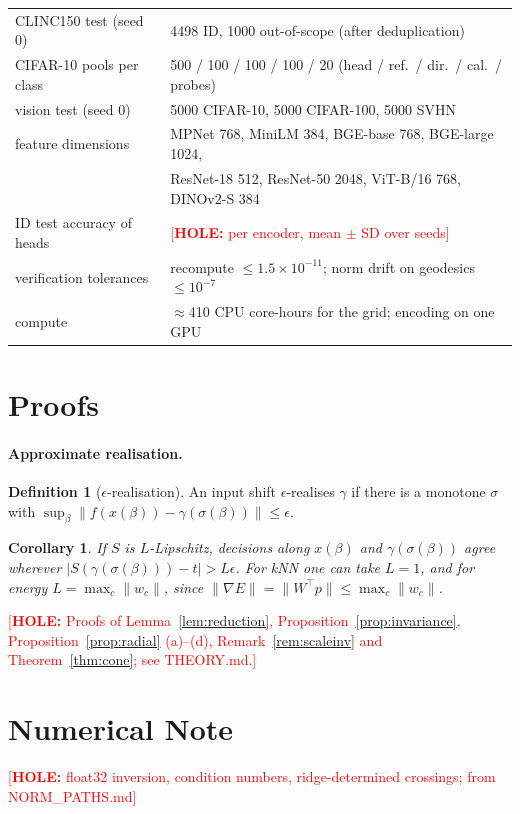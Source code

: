 \documentclass[twoside]{article}
\newtheorem{corollary}{Corollary}
\theoremstyle{definition}
\newtheorem{definition}{Definition}
\theoremstyle{remark}
\newcommand{\hole}[1]{\textcolor{red}{[\textbf{HOLE:} #1]}}
\begin{document}
\begin{table}[!htbp]
\begin{tabular}{ll}
CLINC150 test (seed 0) & 4498 ID, 1000 out-of-scope (after deduplication) \\
CIFAR-10 pools per class & 500 / 100 / 100 / 100 / 20 (head / ref.\ / dir.\ / cal.\ / probes) \\
vision test (seed 0) & 5000 CIFAR-10, 5000 CIFAR-100, 5000 SVHN \\
feature dimensions & MPNet 768, MiniLM 384, BGE-base 768, BGE-large 1024, \\
 & ResNet-18 512, ResNet-50 2048, ViT-B/16 768, DINOv2-S 384 \\
ID test accuracy of heads & \hole{per encoder, mean $\pm$ SD over seeds} \\
verification tolerances & recompute $\le1.5\times10^{-11}$; norm drift on geodesics $\le10^{-7}$ \\
compute & $\approx$410 CPU core-hours for the grid; encoding on one GPU \\
\bottomrule
\end{tabular}
\end{table}

\section{Proofs}\label{app:proofs}
\paragraph{Approximate realisation.}
\begin{definition}[$\epsilon$-realisation]\label{def:realise}
An input shift $\epsilon$-realises $\gamma$ if there is a monotone $\sigma$ with
$\sup_\beta\|f(x(\beta))-\gamma(\sigma(\beta))\|\le\epsilon$.
\end{definition}
\begin{corollary}
If $S$ is $L$-Lipschitz, decisions along $x(\beta)$ and $\gamma(\sigma(\beta))$ agree wherever
$|S(\gamma(\sigma(\beta)))-t|>L\epsilon$. For kNN one can take $L=1$, and for energy $L=\max_c\|w_c\|$, since
$\|\nabla E\|=\|W^\top p\|\le\max_c\|w_c\|$.
\end{corollary}

\hole{Proofs of Lemma~\ref{lem:reduction}, Proposition~\ref{prop:invariance},
Proposition~\ref{prop:radial} (a)--(d), Remark~\ref{rem:scaleinv} and Theorem~\ref{thm:cone}; see THEORY.md.}

\section{Numerical Note}\label{app:numerics}
\hole{float32 inversion, condition numbers, ridge-determined crossings; from NORM\_PATHS.md}
\end{document}
